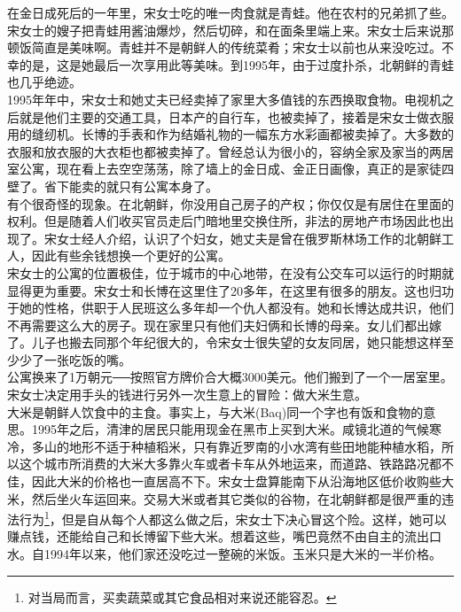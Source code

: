 在金日成死后的一年里，宋女士吃的唯一肉食就是青蛙。他在农村的兄弟抓了些。宋女士的嫂子把青蛙用酱油爆炒，然后切碎，和在面条里端上来。宋女士后来说那顿饭简直是美味啊。青蛙并不是朝鲜人的传统菜肴；宋女士以前也从来没吃过。不幸的是，这是她最后一次享用此等美味。到1995年，由于过度扑杀，北朝鲜的青蛙也几乎绝迹。\\

1995年年中，宋女士和她丈夫已经卖掉了家里大多值钱的东西换取食物。电视机之后就是他们主要的交通工具，日本产的自行车，也被卖掉了，接着是宋女士做衣服用的缝纫机。长博的手表和作为结婚礼物的一幅东方水彩画都被卖掉了。大多数的衣服和放衣服的大衣柜也都被卖掉了。曾经总认为很小的，容纳全家及家当的两居室公寓，现在看上去空空荡荡，除了墙上的金日成、金正日画像，真正的是家徒四壁了。省下能卖的就只有公寓本身了。\\

有个很奇怪的现象。在北朝鲜，你没用自己房子的产权；你仅仅是有居住在里面的权利。但是随着人们收买官员走后门暗地里交换住所，非法的房地产市场因此也出现了。宋女士经人介绍，认识了个妇女，她丈夫是曾在俄罗斯林场工作的北朝鲜工人，因此有些余钱想换一个更好的公寓。\\

宋女士的公寓的位置极佳，位于城市的中心地带，在没有公交车可以运行的时期就显得更为重要。宋女士和长博在这里住了20多年，在这里有很多的朋友。这也归功于她的性格，供职于人民班这么多年却一个仇人都没有。她和长博达成共识，他们不再需要这么大的房子。现在家里只有他们夫妇俩和长博的母亲。女儿们都出嫁了。儿子也搬去同那个年纪很大的，令宋女士很失望的女友同居，她只能想这样至少少了一张吃饭的嘴。\\

公寓换来了1万朝元──按照官方牌价合大概3000美元。他们搬到了一个一居室里。宋女士决定用手头的钱进行另外一次生意上的冒险：做大米生意。\\

大米是朝鲜人饮食中的主食。事实上，与大米(Baq)同一个字也有饭和食物的意思。1995年之后，清津的居民只能用现金在黑市上买到大米。咸镜北道的气候寒冷，多山的地形不适于种植稻米，只有靠近罗南的小水湾有些田地能种植水稻，所以这个城市所消费的大米大多靠火车或者卡车从外地运来，而道路、铁路路况都不佳，因此大米的价格也一直居高不下。宋女士盘算能南下从沿海地区低价收购些大米，然后坐火车运回来。交易大米或者其它类似的谷物，在北朝鲜都是很严重的违法行为\footnote{对当局而言，买卖蔬菜或其它食品相对来说还能容忍。}，但是自从每个人都这么做之后，宋女士下决心冒这个险。这样，她可以赚点钱，还能给自己和长博留下些大米。想着这些，嘴巴竟然不由自主的流出口水。自1994年以来，他们家还没吃过一整碗的米饭。玉米只是大米的一半价格。\\

